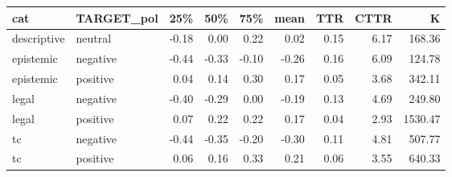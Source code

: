 \begin{table}[ht]
\centering
\begin{tabular}{llrrrrrrr}
  \hline
cat & TARGET\_pol & 25\% & 50\% & 75\% & mean & TTR & CTTR & K \\ 
  \hline
descriptive & neutral & -0.18 & 0.00 & 0.22 & 0.02 & 0.15 & 6.17 & 168.36 \\ 
  epistemic & negative & -0.44 & -0.33 & -0.10 & -0.26 & 0.16 & 6.09 & 124.78 \\ 
  epistemic & positive & 0.04 & 0.14 & 0.30 & 0.17 & 0.05 & 3.68 & 342.11 \\ 
  legal & negative & -0.40 & -0.29 & 0.00 & -0.19 & 0.13 & 4.69 & 249.80 \\ 
  legal & positive & 0.07 & 0.22 & 0.22 & 0.17 & 0.04 & 2.93 & 1530.47 \\ 
  tc & negative & -0.44 & -0.35 & -0.20 & -0.30 & 0.11 & 4.81 & 507.77 \\ 
  tc & positive & 0.06 & 0.16 & 0.33 & 0.21 & 0.06 & 3.55 & 640.33 \\ 
   \hline
\end{tabular}
\end{table}
